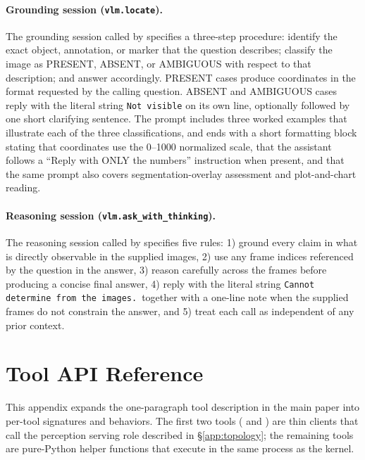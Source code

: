 \paragraph{Grounding session (\texttt{vlm.locate}).}
The grounding session called by  specifies a three-step procedure: identify the exact object, annotation, or marker that the question describes; classify the image as PRESENT, ABSENT, or AMBIGUOUS with respect to that description; and answer accordingly. PRESENT cases produce coordinates in the format requested by the calling question. ABSENT and AMBIGUOUS cases reply with the literal string \texttt{Not visible} on its own line, optionally followed by one short clarifying sentence. The prompt includes three worked examples that illustrate each of the three classifications, and ends with a short formatting block stating that coordinates use the 0--1000 normalized scale, that the assistant follows a ``Reply with ONLY the numbers'' instruction when present, and that the same prompt also covers segmentation-overlay assessment and plot-and-chart reading.

\paragraph{Reasoning session (\texttt{vlm.ask\_with\_thinking}).}
The reasoning session called by  specifies five rules: 1) ground every claim in what is directly observable in the supplied images, 2) use any frame indices referenced by the question in the answer, 3) reason carefully across the frames before producing a concise final answer, 4) reply with the literal string \texttt{Cannot determine from the images.}\ together with a one-line note when the supplied frames do not constrain the answer, and 5) treat each call as independent of any prior context.

\section{Tool API Reference}
\label{app:tools}

This appendix expands the one-paragraph tool description in the main paper into per-tool signatures and behaviors. The first two tools ( and ) are thin clients that call the perception serving role described in \S\ref{app:topology}; the remaining tools are pure-Python helper functions that execute in the same process as the kernel.

